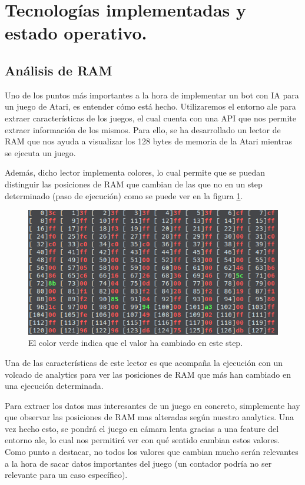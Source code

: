 \section{Tecnologías implementadas y estado operativo.}
\subsection{Análisis de RAM}
\label{subsec:ramanalisi}
Uno de los puntos más importantes a la hora de implementar un bot con IA para un juego de Atari, es entender cómo está hecho. Utilizaremos el entorno \ac{ale} para extraer características de los juegos, el cual cuenta con una API que nos permite extraer información de los mismos. Para ello, se ha desarrollado un lector de RAM que nos ayuda a visualizar los 128 bytes de memoria de la Atari mientras se ejecuta un juego.

Además, dicho lector implementa colores, lo cual permite que se puedan distinguir las posiciones de RAM que cambian de las que no en un step determinado (paso de ejecución)  como se puede ver en la figura \ref{fig:RAM_Colors}.

\begin{figure}[h]
	\centering
	\includegraphics[width=1\textwidth]{Figures/RAMColors}
	\caption{El color verde indica que el valor ha cambiado en este step.}
	\label{fig:RAM_Colors}
\end{figure}

Una de las características de este lector es que acompaña la ejecución con un volcado de analytics para ver las posiciones de RAM que más han cambiado en una ejecución determinada.

Para extraer los datos mas interesantes de un juego en concreto, simplemente hay que observar las posiciones de RAM mas alteradas según nuestro analytics. Una vez hecho esto, se pondrá el juego en cámara lenta gracias a una feature del entorno \ac{ale}, lo cual nos permitirá ver con qué sentido cambian estos valores. Como punto a destacar, no todos los valores que cambian mucho serán relevantes a la hora de sacar datos importantes del juego (un contador podría no ser relevante para un caso específico).

